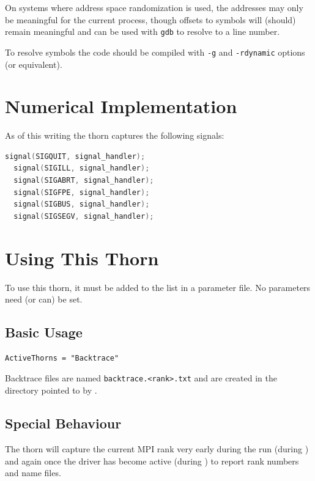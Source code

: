 On systems where address space randomization is used, the addresses may only
be meaningful for the current process, though offsets to symbols will (should)
remain meaningful and can be used with \texttt{gdb} to resolve to a line
number.

To resolve symbols the code should be compiled with \texttt{-g} and
\texttt{-rdynamic} options (or equivalent).

\section{Numerical Implementation}

As of this writing the thorn captures the following signals:

\begin{lstlisting}[language=C]
  signal(SIGQUIT, signal_handler);
  signal(SIGILL, signal_handler);
  signal(SIGABRT, signal_handler);
  signal(SIGFPE, signal_handler);
  signal(SIGBUS, signal_handler);
  signal(SIGSEGV, signal_handler);
\end{lstlisting}

\section{Using This Thorn}

To use this thorn, it must be added to the  list in a
parameter file. No parameters need (or can) be set.

\subsection{Basic Usage}

\begin{lstlisting}
ActiveThorns = "Backtrace"
\end{lstlisting}

Backtrace files are named \texttt{backtrace.<rank>.txt} and are created in the
directory pointed to by .

\subsection{Special Behaviour}

The thorn will capture the current MPI rank very early during the run (during
) and again once the driver has become active (during
) to report rank numbers and name files.


